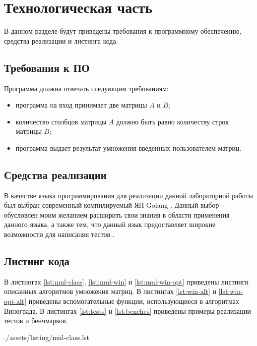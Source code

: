 \chapter{Технологическая часть}

В данном разделе будут приведены требования к программному обеспечению, средства реализации и листинга кода.

\section{Требования к ПО}

Программа должна отвечать следующим требованиям:
\begin{itemize}
	\item программа на вход принимает две матрицы $A$ и $B$;
	\item количество столбцов матрицы $A$ должно быть равно количеству строк матрицы $B$;
	\item программа выдает результат умножения введенных пользователем матриц. 
\end{itemize}

\section{Средства реализации}

В качестве языка программирования для реализации данной лабораторной работы был выбран современный компилируемый ЯП Golang \cite{golang}.
Данный выбор обусловлен моим желанием расширить свои знания в области применения данного языка, а также тем, что данный язык предоставляет широкие возможности для написания тестов \cite{gotest}.

\section{Листинг кода}

В листингах \ref{lst:mul-class}, \ref{lst:mul-win} и \ref{lst:mul-win-opt} приведены листинги описанных алгоритмов умножения матриц.
В листингах \ref{lst:win-alt} и \ref{lst:win-opt-alt} приведены вспомогательные функции, использующиеся в алгоритмах Винограда.
В листингах \ref{lst:tests} и \ref{lst:benches} приведены примеры реализации тестов и бенчмарков.

\clearpage
\begin{lstinputlisting}[
	caption={Классический алгоритм умножения матриц},
	label={lst:mul-class},
	style={golang}
]{./assets/listing/mul-class.lst}
\end{lstinputlisting}

